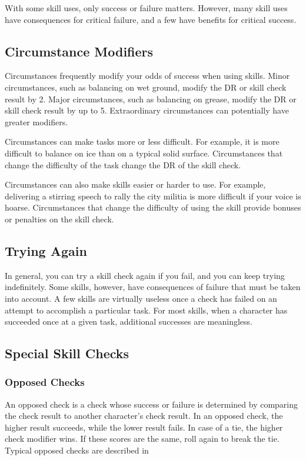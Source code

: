         With some skill uses, only success or failure matters.
        However, many skill uses have consequences for critical failure, and a few have benefits for critical success.

    \subsection{Circumstance Modifiers}

        Circumstances frequently modify your odds of success when using skills.
        Minor circumstances, such as balancing on wet ground, modify the DR or skill check result by 2.
        Major circumstances, such as balancing on grease, modify the DR or skill check result by up to 5.
        Extraordinary circumstances can potentially have greater modifiers.

         Circumstances can make tasks more or less difficult. For example, it is more difficult to balance on ice than on a typical solid surface. Circumstances that change the difficulty of the task change the DR of the skill check.

         Circumstances can also make skills easier or harder to use. For example, delivering a stirring speech to rally the city militia is more difficult if your voice is hoarse. Circumstances that change the difficulty of using the skill provide bonuses or penalties on the skill check.

    \subsection{Trying Again}
        In general, you can try a skill check again if you fail, and you can keep trying indefinitely. Some skills, however, have consequences of failure that must be taken into account. A few skills are virtually useless once a check has failed on an attempt to accomplish a particular task. For most skills, when a character has succeeded once at a given task, additional successes are meaningless.

    \subsection{Special Skill Checks}

        \subsubsection{Opposed Checks}
            An opposed check is a check whose success or failure is determined by comparing the check result to another character's check result. In an opposed check, the higher result succeeds, while the lower result fails. In case of a tie, the higher check modifier wins. If these scores are the same, roll again to break the tie. Typical opposed checks are described in 

